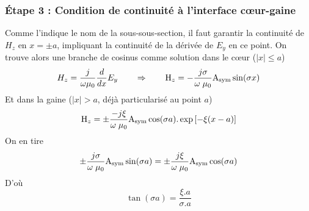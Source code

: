 \subsubsection{Étape 3 : Condition de continuité à l'interface cœur-gaine}
Comme l'indique le nom de la sous-sous-section, il faut garantir la continuité de $H_z$ en 
$x=\pm a$, impliquant la continuité de la dérivée de $E_y$ en ce point. On trouve alors une 
branche de cosinus comme solution dans le cœur ($|x|\leq a$)
\begin{equation}
{H_z} = \frac{j}{{\omega {\rm{ }}{\mu _0}}}\frac{d}{{dx}}{E_y}\qquad\Rightarrow\qquad
{{\rm{H}}_z} =  - \frac{{j\sigma }}{{\omega \;{\mu _0}}}{{\rm{A}}_{{\rm{sym}}}}\sin (\sigma x)
\end{equation}
Et dans la gaine ($|x|>a$, déjà particularisé au point $a$)
\begin{equation}
{{\rm{H}}_z} =  \pm \frac{{ - j\xi }}{{\omega \;{\mu _0}}}{{\rm{A}}_{{\rm{sym}}}}\cos (\sigma a).\exp \left[ { - \xi (x - a)} \right]
\end{equation}
On en tire
\begin{equation}
 \pm \frac{{j\sigma }}{{\omega \;{\mu _0}}}{{\rm{A}}_{{\rm{sym}}}}\sin (\sigma a) =  \pm \frac{{j\xi }}{{\omega \;{\mu _0}}}{{\rm{A}}_{{\rm{sym}}}}\cos (\sigma a)
\end{equation}
D'où
\begin{equation}
\tan (\sigma a) = \frac{{\xi .a}}{{\sigma .a}}
\end{equation}

